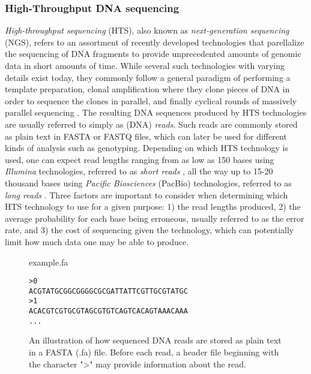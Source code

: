 \subsubsection{High-Throughput DNA sequencing} \label{background:biology:high_throughput_dna_sequencing}
\textit{High-throughput sequencing} (HTS), also known as \textit{next-generation sequencing} (NGS), refers to an assortment of recently developed technologies that parellalize the sequencing of DNA fragments to provide unprecedented amounts of genomic data in short amounts of time.
While several such technologies with varying details exist today, they commonly follow a general paradigm of performing a template preparation, clonal amplification where they clone pieces of DNA in order to sequence the clones in parallel, and finally cyclical rounds of massively parallel sequencing \cite{hts}.
The resulting DNA sequences produced by HTS technologies are usually referred to simply as (DNA) \textit{reads}.
Such reads are commonly stored as plain text in FASTA or FASTQ files, which can later be used for different kinds of analysis such as genotyping.
Depending on which HTS technology is used, one can expect read lengths ranging from as low as 150 bases using \textit{Illumina} technologies, referred to as \textit{short reads} \cite{illumina_read_length}, all the way up to 15-20 thousand bases using \textit{Pacific Biosciences} (PacBio) technologies, referred to as \textit{long reads} \cite{hts2}.
Three factors are important to consider when determining which HTS technology to use for a given purpose: 1) the read lengths produced, 2) the average probability for each base being erroneous, usually referred to as the error rate, and 3) the cost of sequencing given the technology, which can potentially limit how much data one may be able to produce.

\begin{figure}[H]
\begin{center}
\small{example.fa}
\end{center}
\begin{lstlisting}[style=vcf]
>0
ACGTATGCGGCGGGGCGCGATTATTCGTTGCGTATGC
>1
ACACGTCGTGCGTAGCGTGTCAGTCACAGTAAACAAA
...
\end{lstlisting}
\caption{
  An illustration of how sequenced DNA reads are stored as plain text in a FASTA (.fa) file.
  Before each read, a header file beginning with the character ">" may provide information about the read.
}
\label{background:biology:high_throughput_dna_sequencing:figures:fasta}
\end{figure}

